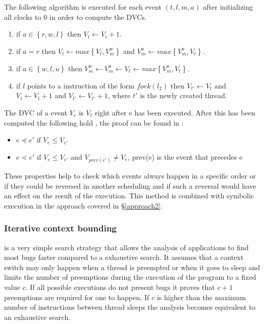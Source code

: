 \documentclass[10pt]{llncs}
\begin{document}
The following algorithm is executed for each event $(t, l, m, a)$ after initializing all clocks to $0$ in order to compute the DVCs.

\begin{enumerate}
	\item if $a \in \left\lbrace r, w, l \right\rbrace$ then $V_t \leftarrow V_t + 1$.
	\item if $a = r$ then $V_t \leftarrow max \left\lbrace V_t, V_m^w \right\rbrace$ and $V_m^a \leftarrow max \left\lbrace V_m^a, V_t \right\rbrace$.
	\item  if $a  \in \left\lbrace w, l, u \right\rbrace$ then $V_m^w \leftarrow V_m^a \leftarrow V_t \leftarrow max \left\lbrace V_m^a, V_t \right\rbrace$.
	\item if $l$ points to a instruction of the form $fork(l_2)$ then $V_{t'} \leftarrow V_t$ and $V_t \leftarrow V_t + 1$ and $V_{t'} \leftarrow V_{t'} + 1$, where $t'$ is the newly created thread.
\end{enumerate}

The DVC of a event $V_e$ is $V_t$ right after e has been executed. After this has been computed the following hold \cite[§4]{base4}, the proof can be found in \cite{dvcproof}:

\begin{itemize}
	\item $e \preceq e'$ if $V_e \leq V_{e'}$
	\item $e \lessdot e'$ if $V_e \leq V_{e'}$ and $V_{prev(e')} \neq V_e$, prev(e) is the event that precedes e
\end{itemize}

These properties help to check which events always happen in a specific order or if they could be reversed in another scheduling and if such a reversal would have an effect on the result of the execution. This method is combined with symbolic execution in the approach covered in §\ref{approach2}.

\subsubsection{Iterative context bounding \cite{Musuvathi}}

is a very simple search strategy that allows the analysis of applications to find most bugs faster compared to a exhaustive search. It assumes that a context switch may only happen when a thread is preempted or when it goes to sleep and limits the number of preemptions during the execution of the program to a fixed value $c$. If all possible executions do not present bugs it proves that $c+1$ preemptions are required for one to happen. If $c$ is higher than the maximum number of instructions between thread sleeps the analysis becomes equivalent to an exhaustive search.
\end{document}
